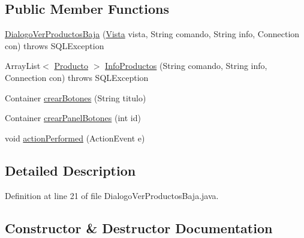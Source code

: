 \subsection*{Public Member Functions}
\begin{DoxyCompactItemize}
\item 
\mbox{\hyperlink{classsociedad2_1_1_dialogo_ver_productos_baja_a9655028d797c1cb985341f22903bc366}{Dialogo\+Ver\+Productos\+Baja}} (\mbox{\hyperlink{classsociedad2_1_1_vista}{Vista}} vista, String comando, String info, Connection con)  throws S\+Q\+L\+Exception 
\item 
Array\+List$<$ \mbox{\hyperlink{classsociedad2_1_1_producto}{Producto}} $>$ \mbox{\hyperlink{classsociedad2_1_1_dialogo_ver_productos_baja_a3cebb225abaf25d0171deedb0fc7dab4}{Info\+Productos}} (String comando, String info, Connection con)  throws S\+Q\+L\+Exception 
\item 
Container \mbox{\hyperlink{classsociedad2_1_1_dialogo_ver_productos_baja_a9a5c2029fed8b8593bf5331a4839cf9b}{crear\+Botones}} (String titulo)
\item 
Container \mbox{\hyperlink{classsociedad2_1_1_dialogo_ver_productos_baja_a7485030e445c2915f90b38075dddb5a3}{crear\+Panel\+Botones}} (int id)
\item 
void \mbox{\hyperlink{classsociedad2_1_1_dialogo_ver_productos_baja_a039af7e6be4890ca43497d8922c30df7}{action\+Performed}} (Action\+Event e)
\end{DoxyCompactItemize}


\subsection{Detailed Description}


Definition at line 21 of file Dialogo\+Ver\+Productos\+Baja.\+java.



\subsection{Constructor \& Destructor Documentation}
\mbox{\label{classsociedad2_1_1_dialogo_ver_productos_baja_a9655028d797c1cb985341f22903bc366}} 
